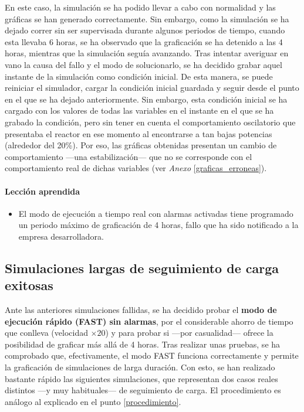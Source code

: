 En este caso, la simulación se ha podido llevar a cabo con normalidad y las gráficas se han generado correctamente. Sin embargo, como la simulación se ha dejado correr sin ser supervisada durante algunos periodos de tiempo, cuando esta llevaba 6 horas, se ha observado que la graficación se ha detenido a las 4 horas, mientras que la simulación seguía avanzando. Tras intentar averiguar en vano la causa del fallo y el modo de solucionarlo, se ha decidido grabar aquel instante de la simulación como condición inicial. De esta manera, se puede reiniciar el simulador, cargar la condición inicial guardada y seguir desde el punto en el que se ha dejado anteriormente. Sin embargo, esta condición inicial se ha cargado con los valores de todas las variables en el instante en el que se ha grabado la condición, pero sin tener en cuenta el comportamiento oscilatorio que presentaba el reactor en ese momento al encontrarse a tan bajas potencias (alrededor del 20\%). Por eso, las gráficas obtenidas presentan un cambio de comportamiento ---una estabilización--- que no se corresponde con el comportamiento real de dichas variables (ver \textit{Anexo} \ref{graficas_erroneas}).

\paragraph{Lección aprendida}

\begin{itemize}
  \item El modo de ejecución a tiempo real con alarmas activadas tiene programado un periodo máximo de graficación de 4 horas, fallo que ha sido notificado a la empresa desarrolladora.
\end{itemize}

\newpage
\subsection{Simulaciones largas de seguimiento de carga exitosas}

Ante las anteriores simulaciones fallidas, se ha decidido probar el \textbf{modo de ejecución rápido (FAST) sin alarmas}, por el considerable ahorro de tiempo que conlleva (velocidad $\times 20$) y para probar si ---por casualidad--- ofrece la posibilidad de graficar más allá de 4 horas. Tras realizar unas pruebas, se ha comprobado que, efectivamente, el modo FAST funciona correctamente y permite la graficación de simulaciones de larga duración. Con esto, se han realizado bastante rápido las siguientes simulaciones, que representan dos casos reales distintos ---y muy habituales--- de seguimiento de carga. El procedimiento es análogo al explicado en el punto \ref{procedimiento}.

